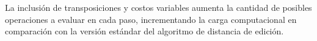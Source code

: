 La inclusión de transposiciones y costos variables aumenta la cantidad de posibles operaciones a evaluar en cada paso, incrementando la carga computacional en comparación con la versión estándar del algoritmo de distancia de edición.


